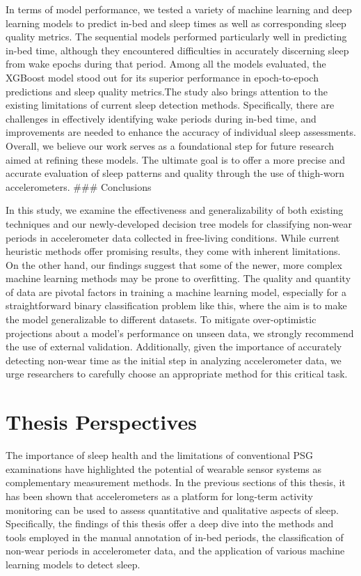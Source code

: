 \documentclass[
  10pt,
]{scrbook}
\begin{document}
In terms of model performance, we tested a variety of machine learning
and deep learning models to predict in-bed and sleep times as well as
corresponding sleep quality metrics. The sequential models performed
particularly well in predicting in-bed time, although they encountered
difficulties in accurately discerning sleep from wake epochs during that
period. Among all the models evaluated, the XGBoost model stood out for
its superior performance in epoch-to-epoch predictions and sleep quality
metrics.The study also brings attention to the existing limitations of
current sleep detection methods. Specifically, there are challenges in
effectively identifying wake periods during in-bed time, and
improvements are needed to enhance the accuracy of individual sleep
assessments. Overall, we believe our work serves as a foundational step
for future research aimed at refining these models. The ultimate goal is
to offer a more precise and accurate evaluation of sleep patterns and
quality through the use of thigh-worn accelerometers. \#\#\# Conclusions

In this study, we examine the effectiveness and generalizability of both
existing techniques and our newly-developed decision tree models for
classifying non-wear periods in accelerometer data collected in
free-living conditions. While current heuristic methods offer promising
results, they come with inherent limitations. On the other hand, our
findings suggest that some of the newer, more complex machine learning
methods may be prone to overfitting. The quality and quantity of data
are pivotal factors in training a machine learning model, especially for
a straightforward binary classification problem like this, where the aim
is to make the model generalizable to different datasets. To mitigate
over-optimistic projections about a model's performance on unseen data,
we strongly recommend the use of external validation. Additionally,
given the importance of accurately detecting non-wear time as the
initial step in analyzing accelerometer data, we urge researchers to
carefully choose an appropriate method for this critical task.

\hypertarget{thesis-perspectives}{%
\chapter{Thesis Perspectives}\label{thesis-perspectives}}

The importance of sleep health and the limitations of conventional PSG
examinations have highlighted the potential of wearable sensor systems
as complementary measurement methods. In the previous sections of this
thesis, it has been shown that accelerometers as a platform for
long-term activity monitoring can be used to assess quantitative and
qualitative aspects of sleep. Specifically, the findings of this thesis
offer a deep dive into the methods and tools employed in the manual
annotation of in-bed periods, the classification of non-wear periods in
accelerometer data, and the application of various machine learning
models to detect sleep.
\end{document}
